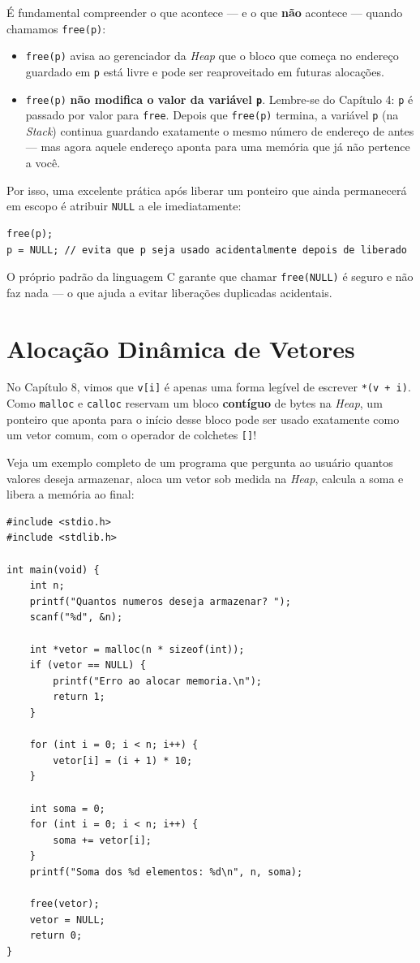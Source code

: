 É fundamental compreender o que acontece — e o que \textbf{não} acontece — quando chamamos \texttt{free(p)}:

\begin{itemize}
    \item \texttt{free(p)} avisa ao gerenciador da \textit{Heap} que o bloco que começa no endereço guardado em \texttt{p} está livre e pode ser reaproveitado em futuras alocações.
    \item \texttt{free(p)} \textbf{não modifica o valor da variável \texttt{p}}. Lembre-se do Capítulo 4: \texttt{p} é passado por valor para \texttt{free}. Depois que \texttt{free(p)} termina, a variável \texttt{p} (na \textit{Stack}) continua guardando exatamente o mesmo número de endereço de antes — mas agora aquele endereço aponta para uma memória que já não pertence a você.
\end{itemize}

Por isso, uma excelente prática após liberar um ponteiro que ainda permanecerá em escopo é atribuir \texttt{NULL} a ele imediatamente:

\begin{lstlisting}
free(p);
p = NULL; // evita que p seja usado acidentalmente depois de liberado
\end{lstlisting}

O próprio padrão da linguagem C garante que chamar \texttt{free(NULL)} é seguro e não faz nada — o que ajuda a evitar liberações duplicadas acidentais.

\section{Alocação Dinâmica de Vetores}
\label{sec:alocacao-vetores}

No Capítulo 8, vimos que \texttt{v[i]} é apenas uma forma legível de escrever \texttt{*(v + i)}. Como \texttt{malloc} e \texttt{calloc} reservam um bloco \textbf{contíguo} de bytes na \textit{Heap}, um ponteiro que aponta para o início desse bloco pode ser usado exatamente como um vetor comum, com o operador de colchetes \texttt{[]}!

Veja um exemplo completo de um programa que pergunta ao usuário quantos valores deseja armazenar, aloca um vetor sob medida na \textit{Heap}, calcula a soma e libera a memória ao final:

\begin{lstlisting}
#include <stdio.h>
#include <stdlib.h>

int main(void) {
    int n;
    printf("Quantos numeros deseja armazenar? ");
    scanf("%d", &n);

    int *vetor = malloc(n * sizeof(int));
    if (vetor == NULL) {
        printf("Erro ao alocar memoria.\n");
        return 1;
    }

    for (int i = 0; i < n; i++) {
        vetor[i] = (i + 1) * 10;
    }

    int soma = 0;
    for (int i = 0; i < n; i++) {
        soma += vetor[i];
    }
    printf("Soma dos %d elementos: %d\n", n, soma);

    free(vetor);
    vetor = NULL;
    return 0;
}
\end{lstlisting}

